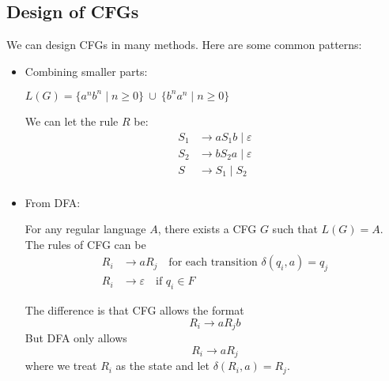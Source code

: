 \subsection{Design of CFGs}
We can design CFGs in many methods. Here are some common patterns:
\begin{itemize}
    \item Combining smaller parts:
    \begin{eg}
        $L(G) = \{ a^n b^n \mid n \geq 0 \} \ \cup \ \{ b^n a^n \mid n \geq 0 \}$
    \end{eg}
    We can let the rule $R$ be:
    \begin{align*}
        S_1 &\to a S_1 b \mid \varepsilon \\
        S_2 &\to b S_2 a \mid \varepsilon \\
        S &\to S_1 \mid S_2 \\
    \end{align*}
    \item From DFA:
    \begin{lemma}
        For any regular language $A$, there exists a CFG $G$ such that $L(G) = A$. The rules of CFG can be 
        \begin{align*}
            R_i &\to aR_j \quad \text{for each transition } \delta(q_i, a) = q_j \\
            R_i &\to \varepsilon \quad \text{if } q_i \in F
        \end{align*}
    \end{lemma}
    The difference is that CFG allows the format
    \[
    R_i \to a R_j b
    \]
    But DFA only allows
    \[
    R_i \to a R_j
    \]
    where we treat $R_i$ as the state and let $\delta(R_i, a) = R_j$.
\end{itemize}

